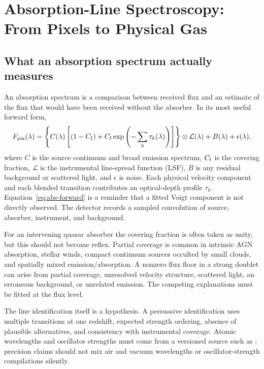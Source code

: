 \chapter{Absorption-Line Spectroscopy: From Pixels to Physical Gas}
\label{chap:absorption}

\section{What an absorption spectrum actually measures}

An absorption spectrum is a comparison between received flux and an estimate
of the flux that would have been received without the absorber. In its most
useful forward form,
\begin{equation}
 F_{\rm pix}(\lambda)=
 \left\{
 C(\lambda)\left[(1-C_{\rm f})+
 C_{\rm f}\exp\left(-\sum_k\tau_k(\lambda)\right)\right]
 \right\}\otimes {\cal L}(\lambda)
 +B(\lambda)+\epsilon(\lambda),
 \label{eq:abs-forward}
\end{equation}
where $C$ is the source continuum and broad emission spectrum, $C_{\rm f}$ is
the covering fraction, $\mathcal{L}$ is the instrumental line-spread function
(LSF), $B$ is any residual background or scattered light, and $\epsilon$ is
noise. Each physical velocity component and each blended transition
contributes an optical-depth profile $\tau_k$. Equation~\ref{eq:abs-forward}
is a reminder that a fitted Voigt component is not directly observed. The
detector records a sampled convolution of source, absorber, instrument, and
background.

For an intervening quasar absorber the covering fraction is often taken as
unity, but this should not become reflex. Partial coverage is common in
intrinsic AGN absorption, stellar winds, compact continuum sources occulted by
small clouds, and spatially mixed emission/absorption. A nonzero flux floor in
a strong doublet can arise from partial coverage, unresolved velocity
structure, scattered light, an erroneous background, or unrelated emission.
The competing explanations must be fitted at the flux level.

The line identification itself is a hypothesis. A persuasive identification
uses multiple transitions at one redshift, expected strength ordering, absence
of plausible alternatives, and consistency with instrumental coverage.
Atomic wavelengths and oscillator strengths must come from a versioned source
such as \citet{Morton2003}; precision claims should not mix air and vacuum
wavelengths or oscillator-strength compilations silently.

